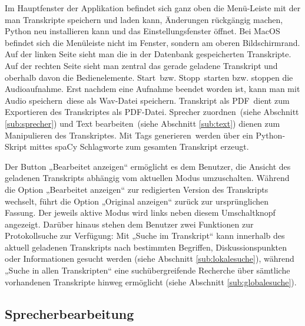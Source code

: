 Im Hauptfenster der Applikation befindet sich ganz oben die Menü-Leiste mit der man Transkripte speichern und laden kann, Änderungen rückgängig machen, Python neu installieren kann und das Einstellungsfenster öffnet. Bei MacOS befindet sich die Menüleiste nicht im Fenster, sondern am oberen Bildschirmrand. Auf der linken Seite sieht man die in der Datenbank gespeicherten Transkripte. Auf der rechten Seite sieht man zentral das gerade geladene Transkript und oberhalb davon die Bedienelemente. \glqq Start\grqq\  bzw. \glqq Stopp\grqq\  starten bzw. stoppen die Audioaufnahme. Erst nachdem eine Aufnahme beendet worden ist, kann man mit \glqq Audio speichern\grqq\ diese als Wav-Datei speichern. \glqq Transkript als PDF\grqq\  dient zum Exportieren des Transkriptes als PDF-Datei. \glqq Sprecher zuordnen\grqq\ (siehe Abschnitt \ref{sub:sprecher}) und \glqq Text bearbeiten\grqq\ (siehe Abschnitt \ref{sub:text}) dienen zum Manipulieren des Transkriptes. Mit \glqq Tags generieren\grqq\ werden über ein Python-Skript mittes spaCy Schlagworte zum gesamten Transkript erzeugt.

Der Button „Bearbeitet anzeigen“ ermöglicht es dem Benutzer, die Ansicht des geladenen Transkripts abhängig vom aktuellen Modus umzuschalten. Während die Option „Bearbeitet anzeigen“ zur redigierten Version des Transkripts wechselt, führt die Option „Original anzeigen“ zurück zur ursprünglichen Fassung. Der jeweils aktive Modus wird links neben diesem Umschaltknopf angezeigt. Darüber hinaus stehen dem Benutzer zwei Funktionen zur Protokollsuche zur Verfügung: Mit „Suche im Transkript“ kann innerhalb des aktuell geladenen Transkripts nach bestimmten Begriffen, Diskussionspunkten oder Informationen gesucht werden (siehe Abschnitt \ref{sub:lokalesuche}), während „Suche in allen Transkripten“ eine suchübergreifende Recherche über sämtliche vorhandenen Transkripte hinweg ermöglicht (siehe Abschnitt \ref{sub:globalesuche}).

\subsection{Sprecherbearbeitung}
\label{sub:sprecher}

